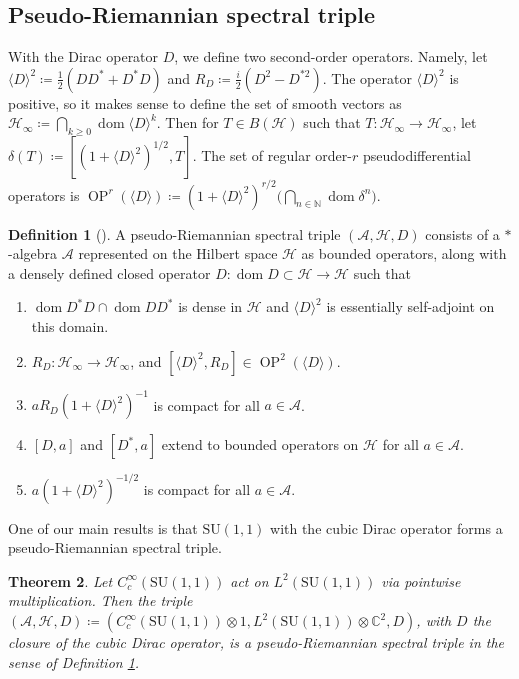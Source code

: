 \documentclass{amsart}
\newtheorem{theorem}{Theorem}[section]
\theoremstyle{definition}
\newtheorem{definition}[theorem]{Definition}
\theoremstyle{remark}
\DeclareMathOperator{\dom}{dom}
\DeclareMathOperator{\OP}{OP}
\numberwithin{equation}{section}
\begin{document}
\subsection{Pseudo-Riemannian spectral triple}\label{sec_pseudo_riemannian}
With the Dirac operator $D$, we define two second-order operators. Namely, let $\langle D\rangle^2\coloneq\tfrac{1}{2}(DD^*+D^*D)$ and $R_D\coloneq\tfrac{i}{2}(D^2-D^{*2})$. The operator $\langle D\rangle^2$ is positive, so it makes sense to define the set of smooth vectors as $\mathcal{H}_\infty\coloneq\bigcap_{k\geq 0}\dom\langle D\rangle^k$. Then for $T\in B(\mathcal{H})$ such that $T\colon\mathcal{H}_\infty\rightarrow\mathcal{H}_\infty$, let $\delta(T)\coloneq[(1+\langle D\rangle^2)^{1/2},T]$. The set of regular order-$r$ pseudodifferential operators is $\OP^r(\langle D\rangle)\coloneq(1+\langle D\rangle^2)^{r/2}\big(\bigcap_{n\in\mathbb{N}}\dom\delta^n\big)$.
\begin{definition}[\cite{dungen_paschke_rennie_2013}]\label{pseudo-riemannian_spectral_triple}
    A pseudo-Riemannian spectral triple $(\mathcal{A},\mathcal{H},D)$ consists of a $*$-algebra $\mathcal{A}$ represented on the Hilbert space $\mathcal{H}$ as bounded operators, along with a densely defined closed operator $D\colon\dom D\subset \mathcal{H}\rightarrow\mathcal{H}$ such that
    \begin{enumerate}[noitemsep]
        \item[(1)] $\dom D^*D\cap\dom DD^*$ is dense in $\mathcal{H}$ and $\langle D\rangle^2$ is essentially self-adjoint on this domain.
        \item[(2a)] $R_D\colon\mathcal{H}_\infty\rightarrow\mathcal{H}_\infty$, and $[\langle D\rangle^2,R_D]\in\OP^2(\langle D\rangle)$.
        \item[(2b)] $aR_D(1+\langle D\rangle^2)^{-1}$ is compact for all $a\in\mathcal{A}$.
        \item[(3)] $[D,a]$ and $[D^*,a]$ extend to bounded operators on $\mathcal{H}$ for all $a\in\mathcal{A}$.
        \item[(4)] $a(1+\langle D\rangle^2)^{-1/2}$ is compact for all $a\in\mathcal{A}$.
    \end{enumerate}
\end{definition}

One of our main results is that $\mathrm{SU}(1,1)$ with the cubic Dirac operator forms a pseudo-Riemannian spectral triple.

\begin{theorem}\label{spectral_triple}
    Let $C_c^\infty(\mathrm{SU}(1,1))$ act on $L^2(\mathrm{SU}(1,1))$ via pointwise multiplication. Then the triple $(\mathcal{A},\mathcal{H},D)\coloneq(C^\infty_c(\mathrm{SU}(1,1))\otimes 1,L^2(\mathrm{SU}(1,1))\otimes\mathbb{C}^2,D)$, with $D$ the closure of the cubic Dirac operator, is a pseudo-Riemannian spectral triple in the sense of Definition \ref{pseudo-riemannian_spectral_triple}.
\end{theorem}
\end{document}
